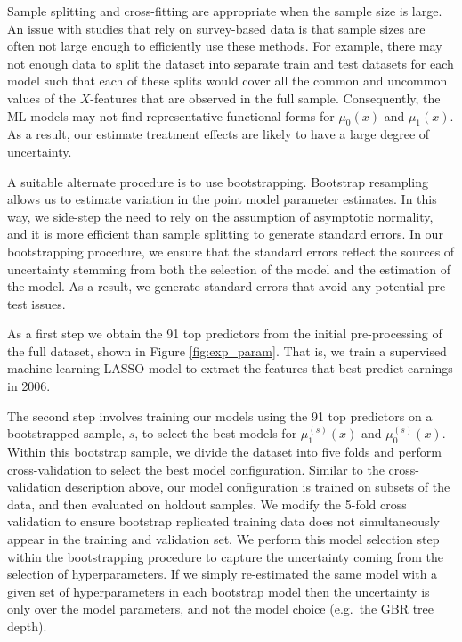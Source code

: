 \documentclass[12pt, a4paper]{article}
\begin{document}
Sample splitting and cross-fitting are appropriate when the sample size is
large. An issue with studies that rely on survey-based data is that sample
sizes are often not large enough to efficiently use these methods. For example,
there may not enough data to split the dataset into separate train and test
datasets for each model such that each of these splits would cover all the
common and uncommon values of the $X$-features that are observed in the full
sample. Consequently, the ML models may not find representative functional
forms for $\mu_0(x)$ and $\mu_1(x)$.
As a result, our estimate treatment effects are likely to have a large degree
of uncertainty.

A suitable alternate procedure is to use bootstrapping. Bootstrap resampling
allows us to estimate variation in the point model parameter estimates. In this
way, we side-step the need to rely on the assumption of asymptotic normality,
and it is more efficient than sample splitting to generate standard errors. In
our bootstrapping procedure, we ensure that the standard errors reflect the
sources of uncertainty stemming from both the selection of the model and the
estimation of the model. As a result, we generate standard errors that avoid
any potential pre-test issues.

As a first step we obtain the 91 top predictors from the initial
pre-processing of the full dataset, shown in Figure \ref{fig:exp_param}. That
is, we train a supervised machine learning LASSO model to extract the features
that best predict earnings in 2006.

The second step involves training our models using the 91 top predictors on a
bootstrapped sample, $s$, to select the best models for $\mu^{(s)}_1(x)$ and
$\mu^{(s)}_0(x)$. Within this bootstrap sample, we divide the dataset into five
folds and perform cross-validation to select the best model configuration.
Similar to the cross-validation description above, our model configuration is
trained on subsets of the data, and then evaluated on holdout samples. We
modify the 5-fold cross validation to ensure bootstrap replicated training data
does not simultaneously appear in the training and validation set. We perform
this model selection step within the bootstrapping procedure to capture the
uncertainty coming from the selection of hyperparameters. If we simply
re-estimated the same model with a given set of hyperparameters in each
bootstrap model then the uncertainty is only over the model parameters, and not
the model choice (e.g.~the GBR tree depth).
\end{document}
